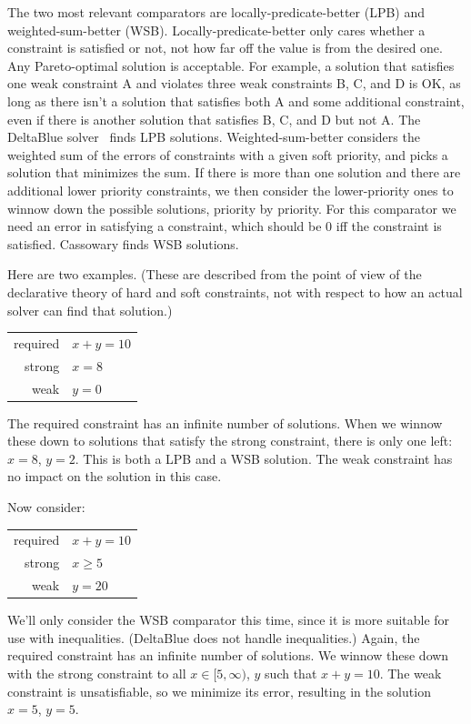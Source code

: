 \documentclass{article}
\newcounter{examples}
\begin{document}
The two most relevant comparators are
locally-predicate-better (LPB) and weighted-sum-better (WSB)\@.
Locally-predicate-better only cares whether a constraint is satisfied
or not, not how far off the value is from the desired one.  Any
Pareto-optimal solution is acceptable.  For example, a solution that
satisfies one weak constraint A and violates three weak constraints B,
C, and D is OK, as long as there isn't a solution that satisfies both
A and some additional constraint, even if there is another solution
that satisfies B, C, and D but not A\@.  The DeltaBlue
solver~\cite{freeman-benson-cacm-1990} finds LPB solutions.
Weighted-sum-better considers the weighted sum of the errors of
constraints with a given soft priority, and picks a solution that
minimizes the sum.  If there is more than one solution and there are
additional lower priority constraints, we then consider the
lower-priority ones to winnow down the possible solutions, priority by
priority.  For this comparator we need an error in satisfying a
constraint, which should be 0 iff the constraint is satisfied.
Cassowary \cite{badros-tochi-2001} finds WSB solutions.

Here are two examples.  (These are described from the point of view of
the declarative theory of hard and soft constraints, not with respect
to how an actual solver can find that solution.)

\begin{tabular}{rl}
required & $x+y=10$ \\
strong   & $x=8$ \\
weak     & $y=0$
\end{tabular}

The required constraint has an infinite number of solutions.  When we
winnow these down to solutions that satisfy the strong constraint,
there is only one left: $x=8$, $y=2$.  This is both a LPB and a WSB
solution.  The weak constraint has no impact on the solution in this
case.

Now consider:

\begin{tabular}{rl}
required & $x+y=10$ \\
strong   & $x \geq 5$ \\
weak     & $y=20$
\end{tabular}

We'll only consider the WSB comparator this time, since it is more
suitable for use with inequalities.  (DeltaBlue does not handle inequalities.)
Again, the required constraint has an infinite number of solutions.
We winnow these down with the strong constraint to all $x \in
[5,\infty)$, $y$ such that $x+y=10$.   The weak constraint is
  unsatisfiable, so we minimize its error, resulting in the solution
  $x=5$, $y=5$.
\end{document}
